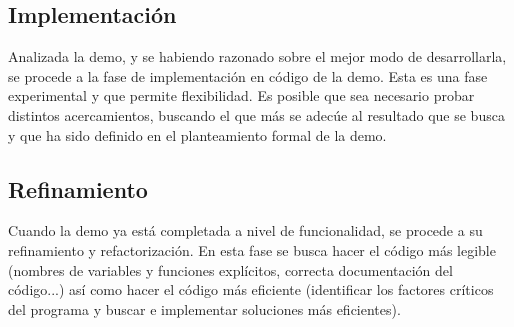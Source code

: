 \subsection{Implementación}

Analizada la demo, y se habiendo razonado sobre el mejor modo de desarrollarla, se procede a la fase de implementación en código de la demo. Esta es una fase experimental y que permite flexibilidad. Es posible que sea necesario probar distintos acercamientos, buscando el que más se adecúe al resultado que se busca y que ha sido definido en el planteamiento formal de la demo.

\subsection{Refinamiento}

Cuando la demo ya está completada a nivel de funcionalidad, se procede a su refinamiento y refactorización. En esta fase se busca hacer el código más legible (nombres de variables y funciones explícitos, correcta documentación del código...) así como hacer el código más eficiente (identificar los factores críticos del programa y buscar e implementar soluciones más eficientes).
